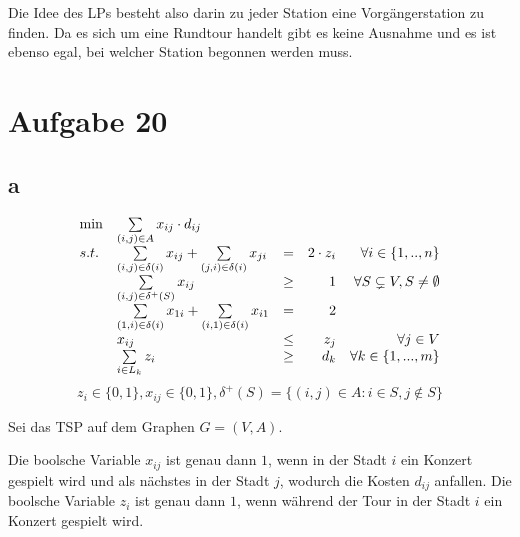 \documentclass[10pt]{article}
\begin{document}
      Die Idee des LPs besteht also darin zu jeder Station eine Vorgängerstation
      zu finden. Da es sich um eine Rundtour handelt gibt es keine Ausnahme und
      es ist ebenso egal, bei welcher Station begonnen werden muss.

      
  \section*{Aufgabe 20}
    \subsection*{a}
      \begin{displaymath}
        \begin{array}{ l l c r r }
          \min & \sum\limits_{(i,j)\in A} x_{ij}\cdot d_{ij} & & & \\
          s.t. & \sum\limits_{(i,j)\in \delta(i)} x_{ij}
          +\sum\limits_{(j,i)\in\delta(i)} x_{ji}& = & 2\cdot z_{i} & \forall 
            i\in \{1,..,n\}\\
            & \sum\limits_{(i,j)\in \delta^{+}(S)} x_{ij} & \geq &  1 & \forall
            S\subsetneq V, S\neq \emptyset \\
            & \sum\limits_{(1,i)\in\delta(i)} x_{1i} +
            \sum\limits_{(i,1)\in\delta(i)} x_{i1} &=& 2 & \\
            & x_{ij} & \leq & z_{j} & \forall j\in V \\
            &\sum\limits_{i\in L_{k}} z_{i} & \geq & d_{k} & \forall k\in\{1,...,m\}
        \end{array}
      \end{displaymath}
      \begin{displaymath}
        z_{i}\in\{0,1\},x_{ij}\in\{0,1\}, \delta^{+}(S)=\{(i,j)\in A:i\in S, j\not\in S\}
      \end{displaymath}

      Sei das TSP auf dem Graphen $G=(V,A)$.

      Die boolsche Variable $x_{ij}$ ist genau dann $1$, wenn in der Stadt $i$
      ein Konzert gespielt wird und als nächstes in der Stadt $j$, wodurch die
      Kosten $d_{ij}$ anfallen.
      Die boolsche Variable $z_{i}$ ist genau dann $1$, wenn während der Tour
      in der Stadt $i$ ein Konzert gespielt wird.
\end{document}
